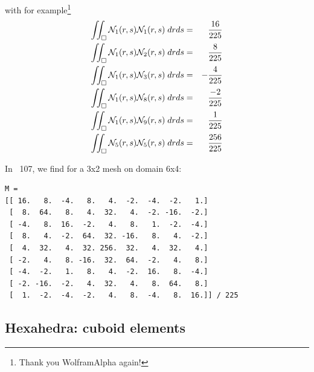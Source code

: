 with for example\footnote{Thank you WolframAlpha again!}
\begin{eqnarray}
\iint_\square {\mathcal{N}}_1(r,s) {\mathcal{N}}_1(r,s) \; drds &=&  \frac{16}{225} \\
\iint_\square {\mathcal{N}}_1(r,s) {\mathcal{N}}_2(r,s) \; drds &=& \frac{8}{225} \\ 
\iint_\square {\mathcal{N}}_1(r,s) {\mathcal{N}}_3(r,s) \; drds &=&  -\frac{4}{225} \\
\iint_\square {\mathcal{N}}_1(r,s) {\mathcal{N}}_8(r,s) \; drds &=&  \frac{-2}{225} \\
\iint_\square {\mathcal{N}}_1(r,s) {\mathcal{N}}_9(r,s) \; drds &=&  \frac{1}{225} \\
\iint_\square {\mathcal{N}}_5(r,s) {\mathcal{N}}_5(r,s) \; drds &=&  \frac{256}{225} \\
\end{eqnarray}

In \stone~107, we find for a 3x2 mesh on domain 6x4:
\begin{verbatim}
M = 
[[ 16.   8.  -4.   8.   4.  -2.  -4.  -2.   1.]
 [  8.  64.   8.   4.  32.   4.  -2. -16.  -2.]
 [ -4.   8.  16.  -2.   4.   8.   1.  -2.  -4.]
 [  8.   4.  -2.  64.  32. -16.   8.   4.  -2.]
 [  4.  32.   4.  32. 256.  32.   4.  32.   4.]
 [ -2.   4.   8. -16.  32.  64.  -2.   4.   8.]
 [ -4.  -2.   1.   8.   4.  -2.  16.   8.  -4.]
 [ -2. -16.  -2.   4.  32.   4.   8.  64.   8.]
 [  1.  -2.  -4.  -2.   4.   8.  -4.   8.  16.]] / 225
\end{verbatim}







\newpage
\subsection{Hexahedra: cuboid elements}

